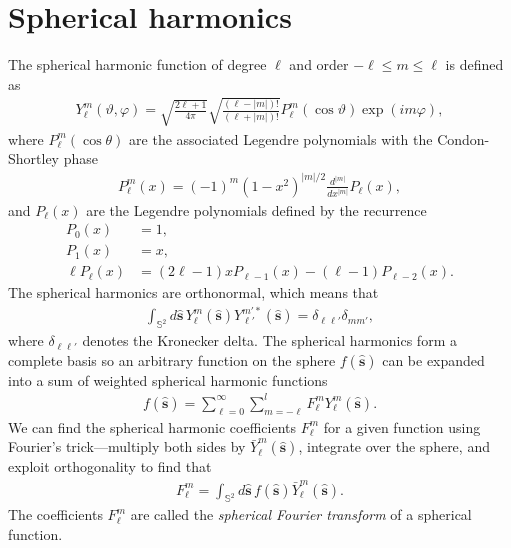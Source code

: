 \documentclass[]{osa-article}
\providecommand{\mh}[1]{\mathbf{\hat{#1}}}
\providecommand{\mbb}[1]{\mathbb{#1}}
\begin{document}
\section{Spherical harmonics}\label{sec:sph}
The spherical harmonic function of degree $\ell$ and order $-\ell \leq m \leq \ell$
is defined as \cite{schaeffer2013}
\begin{align}
Y_\ell^m(\vartheta, \varphi) = \sqrt{\frac{2\ell+1}{4\pi}}\sqrt{\frac{(\ell-|m|)!}{(\ell+|m|)!}}P_\ell^m\left(\cos\vartheta\right)\exp(i m \varphi),
\end{align}
where $P_\ell^m(\cos\theta)$ are the associated Legendre polynomials with the
Condon-Shortley phase
\begin{align}
  P_\ell^m(x) = (-1)^m(1-x^2)^{|m|/2}\frac{d^{|m|}}{dx^{|m|}}P_\ell(x),
\end{align}
and $P_\ell(x)$ are the Legendre polynomials defined by the recurrence
\begin{align}
  P_0(x) &= 1,\\
  P_1(x) &= x,\\
  \ell P_\ell(x) &= (2\ell-1)xP_{\ell-1}(x) - (\ell-1)P_{\ell-2}(x). 
\end{align}
The spherical harmonics are orthonormal, which means that
\begin{align}
  \int_{\mbb{S}^2}d\mh{s}\, Y_\ell^m(\mh{s}){Y}_{\ell'}^{m'*}(\mh{s}) = \delta_{\ell\ell'}\delta_{mm'},
\end{align}
where $\delta_{\ell\ell'}$ denotes the Kronecker delta. The spherical harmonics form a
complete basis so an arbitrary function on the sphere $f(\mh{s})$ can be
expanded into a sum of weighted spherical harmonic functions
\begin{align}
  f(\mh{s}) = \sum_{\ell=0}^{\infty}\sum_{m=-\ell}^{l}F_\ell^mY_\ell^m(\mh{s}).
\end{align}
We can find the spherical harmonic coefficients $F_\ell^m$ for a given function
using Fourier's trick---multiply both sides by $\bar{Y}_\ell^m(\mh{s})$,
integrate over the sphere, and exploit orthogonality to find that
\begin{align}
  F_\ell^m = \int_{\mbb{S}^2}d\mh{s}\, f(\mh{s})\bar{Y}_\ell^m(\mh{s}).
\end{align}
The coefficients $F_\ell^m$ are called the \textit{spherical Fourier transform}
of a spherical function.
\end{document}
